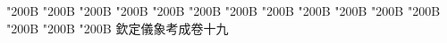 \begin{正文}
\char"200B\relax{}
\char"200B\relax{}
\char"200B\relax{}
\char"200B\relax{}
\char"200B\relax{}
\char"200B\relax{}
\char"200B\relax{}
\char"200B\relax{}
\char"200B\relax{}
\char"200B\relax{}
\char"200B\relax{}
\char"200B\relax{}
\char"200B\relax{}
\char"200B\relax{}
\char"200B\relax{}
欽定儀象考成卷十九
\par

\par\end{正文}\clearpage
